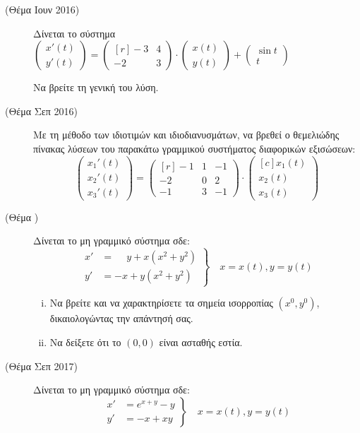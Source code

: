 \begin{enumerate}
\begin{description}
\item[(Θέμα Ιουν 2016)]
   Δίνεται το σύστημα $\begin{pmatrix}
  x'(t) \\ y'(t)
\end{pmatrix}=\begin{pmatrix*}[r]
    -3 & 4 \\
    -2 & 3
\end{pmatrix*}\cdot \begin{pmatrix*}
  x(t)\\y(t)
\end{pmatrix*}+\begin{pmatrix*}
\sin t\\
t
\end{pmatrix*}$

Να βρείτε τη γενική του λύση.
\item[(Θέμα Σεπ 2016)] Με τη μέθοδο των ιδιοτιμών και ιδιοδιανυσμάτων, να βρεθεί ο θεμελιώδης πίνακας λύσεων του παρακάτω γραμμικού συστήματος διαφορικών εξισώσεων:
\[
\begin{pmatrix*}
  {x_{1}}'(t)\\ {x_{2}}'(t)\\ {x_{3}}'(t)
\end{pmatrix*}=\begin{pmatrix*}[r]
  -1 & 1 & -1 \\
  -2 & 0 & 2 \\
  -1 & 3 & -1
\end{pmatrix*}\cdot \begin{pmatrix*}[c]
  x_{1}(t) \\ x_{2}(t)\\x_{3}(t)
\end{pmatrix*}
\]

\item[(Θέμα )] Δίνεται το μη γραμμικό σύστημα σδε:
\[
\left.
\begin{aligned}
  x'&=\phantom{-}y+x(x^{2}+y^{2}) \\
  y'&=-x+y(x^{2}+y^{2})
\end{aligned}
\right\} \quad x=x(t), y=y(t)
\]
\begin{enumerate}[i)]
  \item Να βρείτε και να χαρακτηρίσετε τα σημεία ισορροπίας $(x^{0},y^{0})$, δικαιολογώντας την απάντησή σας.
  \item Να δείξετε ότι το $(0,0)$ είναι ασταθής εστία.
\end{enumerate}

\item[(Θέμα Σεπ 2017)]
Δίνεται το μη γραμμικό σύστημα σδε:
\[
\left.
\begin{aligned}
  x'&=e^{x+y}-y \\
  y'&=-x+xy
\end{aligned}
\right\} \quad x=x(t), y=y(t)
\]


\end{description}
\end{enumerate}
